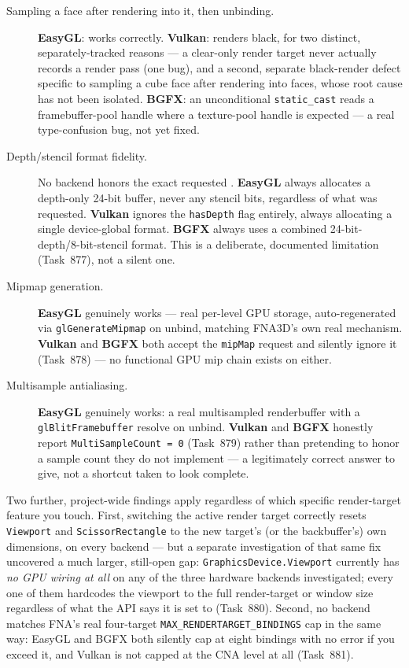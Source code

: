 \begin{description}
  \item[Sampling a  face after rendering into it, then unbinding.]
        \textbf{EasyGL}: works correctly. \textbf{Vulkan}: renders black, for two distinct,
        separately-tracked reasons --- a clear-only render target never actually records a
        render pass (one bug), and a second, separate black-render defect specific to sampling
        a cube face after rendering into faces, whose root cause has not been isolated.
        \textbf{BGFX}: an unconditional \texttt{static\_cast} reads a framebuffer-pool handle
        where a texture-pool handle is expected --- a real type-confusion bug, not yet fixed.
  \item[Depth/stencil format fidelity.] No backend honors the exact requested
        . \textbf{EasyGL} always allocates a depth-only 24-bit buffer,
        never any stencil bits, regardless of what was requested. \textbf{Vulkan} ignores the
        \texttt{hasDepth} flag entirely, always allocating a single device-global format.
        \textbf{BGFX} always uses a combined 24-bit-depth/8-bit-stencil format. This is a
        deliberate, documented limitation (Task~877), not a silent one.
  \item[Mipmap generation.] \textbf{EasyGL} genuinely works --- real per-level GPU storage,
        auto-regenerated via \texttt{glGenerateMipmap} on unbind, matching FNA3D's own real
        mechanism. \textbf{Vulkan} and \textbf{BGFX} both accept the \texttt{mipMap} request
        and silently ignore it (Task~878) --- no functional GPU mip chain exists on either.
  \item[Multisample antialiasing.] \textbf{EasyGL} genuinely works: a real multisampled
        renderbuffer with a \texttt{glBlitFramebuffer} resolve on unbind. \textbf{Vulkan} and
        \textbf{BGFX} honestly report \texttt{MultiSampleCount = 0} (Task~879) rather than
        pretending to honor a sample count they do not implement --- a legitimately correct
        answer to give, not a shortcut taken to look complete.
\end{description}

Two further, project-wide findings apply regardless of which specific render-target feature
you touch. First, switching the active render target correctly resets \texttt{Viewport} and
\texttt{ScissorRectangle} to the new target's (or the backbuffer's) own dimensions, on every
backend --- but a separate investigation of that same fix uncovered a much larger, still-open
gap: \texttt{GraphicsDevice.Viewport} currently has \emph{no GPU wiring at all} on any of the
three hardware backends investigated; every one of them hardcodes the viewport to the full
render-target or window size regardless of what the API says it is set to (Task~880).
Second, no backend matches FNA's real four-target \texttt{MAX\_RENDERTARGET\_BINDINGS} cap
in the same way: EasyGL and BGFX both silently cap at eight bindings with no error if you
exceed it, and Vulkan is not capped at the CNA level at all (Task~881).

